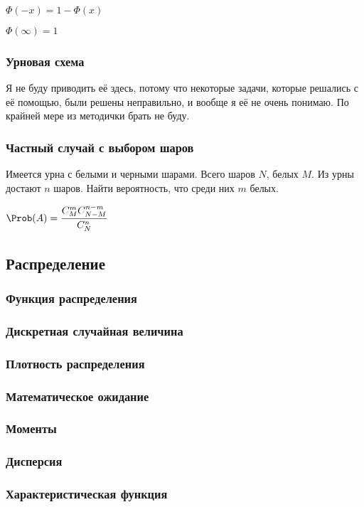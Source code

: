 $\Phi(-x) = 1 - \Phi(x)$

$\Phi(\infty) = 1$

\subsubsection{Урновая схема}

Я не буду приводить её здесь, потому что некоторые задачи, которые решались с её помощью, были решены неправильно, и вообще я её не очень понимаю. По крайней мере из методички брать не буду.

\subsubsection{Частный случай с выбором шаров}

Имеется урна с белыми и черными шарами. Всего шаров $N$, белых $M$. Из урны достают $n$ шаров. Найти вероятность, что среди них $m$ белых.

$\displaystyle \Prob(A) = \frac{C_M^m C_{N-M}^{n-m}}{C_N^n} $

\subsection{Распределение}

\subsubsection{Функция распределения}
\subsubsection{Дискретная случайная величина}
\subsubsection{Плотность распределения}
\subsubsection{Математическое ожидание}
\subsubsection{Моменты}
\subsubsection{Дисперсия}
\subsubsection{Характеристическая функция}
